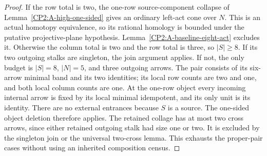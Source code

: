 \begin{proof}
If the row total is two, the one-row source-component
collapse of Lemma~\ref{CP2:A-high-one-sided} gives an
ordinary left-act cone over $N$.  This is an actual
homotopy equivalence, so its rational homology is
bounded under the putative projective-plane hypothesis.
Lemma~\ref{CP2:A-baseline-eight-act} excludes it.
Otherwise the column total is two and the row total
is three, so $|S|\geq8$.  If its two outgoing stalks
are singleton, the join argument applies.  If not,
the only budget is $|S|=8$, $|N|=5$, and three
outgoing arrows.  The pair consists of its six-arrow
minimal band and its two identities; its local row
counts are two and one, and both local column counts
are one.  At the one-row object every incoming
internal arrow is fixed by its local minimal
idempotent, and its only unit is its identity.
There are no external entrances because $S$ is a
source.  The one-sided object deletion therefore
applies.  The retained collage has at most two
cross arrows, since either retained outgoing stalk
had size one or two.  It is excluded by the
singleton join or the universal two-cross lemma.
This exhausts the proper-pair cases without using
an inherited composition census.
\end{proof}
